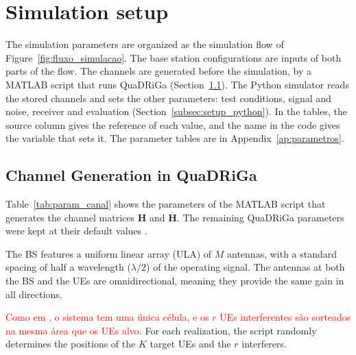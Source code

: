 \section{Simulation setup}
The simulation parameters are organized as the simulation flow of Figure~\ref{fig:fluxo_simulacao}. The base station configurations are inputs of both parts of the flow. The channels are generated before the simulation, by a MATLAB script that runs QuaDRiGa (Section~\ref{subsec:setup_canal}). The Python simulator reads the stored channels and sets the other parameters: test conditions, signal and noise, receiver and evaluation (Section~\ref{subsec:setup_python}). In the tables, the source column gives the reference of each value, and the name in the code gives the variable that sets it. The parameter tables are in Appendix~\ref{ap:parametros}.

\subsection{Channel Generation in QuaDRiGa}\label{subsec:setup_canal}

Table~\ref{tab:param_canal} shows the parameters of the MATLAB script that generates the channel matrices $\mathbf{H}$ and $\overline{\mathbf{H}}$. The remaining QuaDRiGa parameters were kept at their default values \cite{quadriga-manual}.

The BS features a uniform linear array (ULA) of $M$ antennas, with a standard spacing of half a wavelength ($\lambda/2$) of the operating signal. The antennas at both the BS and the UEs are omnidirectional, meaning they provide the same gain in all directions.

\textcolor{red}{Como em \cite{zhao2025jsac}, o sistema tem uma única célula, e os $r$ UEs interferentes são sorteados na mesma área que os UEs alvo.} For each realization, the script randomly determines the positions of the $K$ target UEs and the $r$ interferers.

